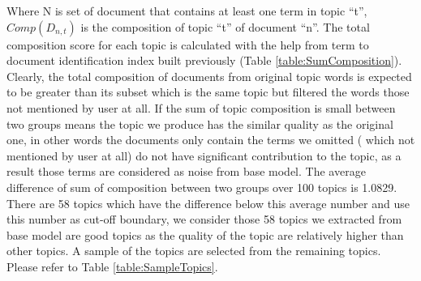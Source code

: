 \documentclass[11pt,twoside]{report}
\begin{document}
Where N is set of document that contains at least one term in topic ``t'', $Comp(D_{n,t})$ is the composition of topic ``t'' of document ``n''. 
The total composition score for each topic is calculated with the help from term to document identification index built previously (Table \ref{table:SumComposition}). Clearly, the total composition of documents from original topic words is expected to be greater than its subset which is the same topic but filtered the words those not mentioned by user at all. If the sum of topic composition is small between two groups means the topic we produce has the similar quality as the original one, in other words the documents only contain the terms we omitted ( which not mentioned by user at all) do not have significant contribution to the topic, as a result those terms are considered as noise from base model.
The average difference of sum of composition between two groups over 100 topics is 1.0829. There are 58 topics which have the difference below this average number and use this number as cut-off boundary, we consider those 58 topics we extracted from base model are good topics as the quality of the topic are relatively higher than other topics. A sample of the topics are selected from the remaining topics. Please refer to Table \ref{table:SampleTopics}.
\end{document}
